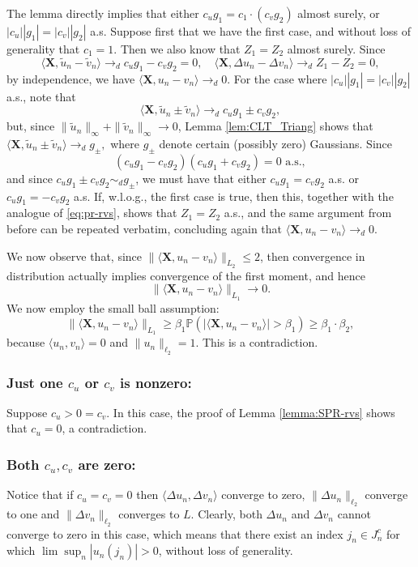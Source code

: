 \documentclass[a4paper,12pt]{amsart}
\numberwithin{equation}{section}
\newcommand{\X}{\mathbf X}
\begin{document}
The lemma directly implies that either $c_u g_1 = c_1 \cdot (c_v g_2)$ almost surely, or $|c_u||g_1| = |c_v| |g_2|$ a.s. Suppose first that we have the first case, and without loss of generality that $c_1 = 1$. Then we also know that $Z_1 = Z_2$ almost surely. Since 
\[
\langle \X, \tilde{u}_n-\tilde{v}_n\rangle \to_d c_u g_1 - c_v g_2 = 0, \quad \langle \X, \Delta u_n - \Delta v_n \rangle \to_d Z_1 - Z_2 = 0, 
\]
by independence, we have $\langle \X, u_n - v_n \rangle \to_d 0.$ For the case where $|c_u||g_1| = |c_v| |g_2|$ a.s., note that 
\[
\langle \X, \tilde{u}_n \pm \tilde{v}_n \rangle \to_d c_u g_1 \pm c_v g_2,
\]
but, since $\|\tilde{u}_n\|_{\infty} + \|\tilde{v}_n\|_{\infty} \to 0$, Lemma \ref{lem:CLT_Triang} shows that $\langle \X,\tilde{u}_n \pm \tilde{v}_n \rangle \to_d g_{\pm},$ where $g_{\pm}$ denote certain (possibly zero) Gaussians. Since 
\[
(c_u g_1 - c_v g_2)(c_u g_1 + c_v g_2) = 0 \text{ a.s.}, 
\]
and since $c_u g_1 \pm c_v g_2 \sim_d g_{\pm}$, we must have that either $c_u g_1 = c_v g_2$ a.s. or $c_u g_1 = - c_v g_2$ a.s. If, w.l.o.g., the first case is true, then this, together with the analogue of \eqref{eq:pr-rvs}, shows that $Z_1 = Z_2$ a.s., and the same argument from before can be repeated verbatim, concluding again that $\langle \X, u_n - v_n \rangle \to_d 0$. 


We now observe that, since $\| \langle \X, u_n - v_n \rangle \|_{L_2} \le 2$, then convergence in distribution actually implies convergence of the first moment, and hence 
\[
\| \langle \X, u_n - v_n\rangle \|_{L_1} \to 0. 
\]
We now employ the small ball assumption:
\[
\| \langle \X, u_n - v_n\rangle \|_{L_1} \ge \beta_1 \mathbb{P} \left( | \langle \X, u_n - v_n\rangle| > \beta_1\right) \ge \beta_1 \cdot \beta_2,
\]
 because $\langle u_n,v_n\rangle=0$ and $\|u_n\|_{\ell_2}=1$. This is a contradiction. 
\medskip




\subsubsection{\textbf{ Just one $c_u$ or $c_v$ is nonzero:}} Suppose $c_u > 0 = c_v.$ In this case, the proof of Lemma \ref{lemma:SPR-rvs} shows that $c_u = 0$, a contradiction. 
\medskip

\subsubsection{\textbf{ Both $c_u,c_v$ are zero:}} 

Notice that if $c_u=c_v=0$ then $\langle \Delta u_n,\Delta v_n \rangle$ converge to zero, $\|\Delta u_n\|_{\ell_2}$ converge to one and $\|\Delta v_n\|_{\ell_2}$ converges to $L$. Clearly, both $\Delta u_n$ and $\Delta v_n$ cannot converge to zero in this case, which means that there exist an index  $j_n \in J_n^c$ for which $\lim \sup_n |u_n(j_n)| >0$, without loss of generality. 
\end{document}
